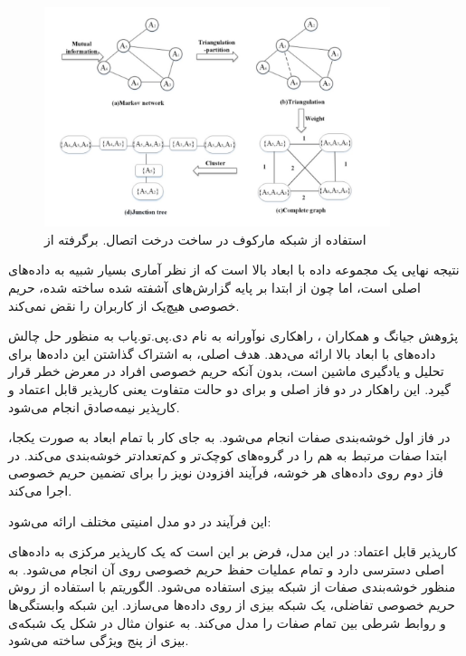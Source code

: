 \begin{figure}[h]
  \centering
  \includegraphics[width=0.9\textwidth]{figs/PrivPJ_Markov.jpg}
  \caption{استفاده از شبکه مارکوف در ساخت درخت اتصال. برگرفته از }
  \label{fig:PrivPJ}
\end{figure}

نتیجه نهایی یک مجموعه داده با ابعاد بالا است که از نظر آماری بسیار شبیه به داده‌های اصلی است، اما چون از ابتدا بر پایه گزارش‌های آشفته ‌شده ساخته شده، حریم خصوصی هیچ‌یک از کاربران را نقض نمی‌کند.


پژوهش جیانگ و همکاران ، راهکاری نوآورانه به نام دی.پی.تو.پاب به منظور حل چالش داده‌های با ابعاد بالا ارائه می‌دهد. هدف اصلی، به اشتراک گذاشتن این داده‌ها برای تحلیل و یادگیری ماشین است، بدون آنکه حریم خصوصی افراد در معرض خطر قرار گیرد. این راهکار در دو فاز اصلی و برای دو حالت متفاوت یعنی کارپذیر قابل اعتماد و کارپذیر نیمه‌صادق انجام می‌شود. 

در فاز اول خوشه‌بندی صفات انجام می‌شود. به جای کار با تمام ابعاد به صورت یکجا، ابتدا صفات مرتبط به هم را در گروه‌های کوچک‌تر و کم‌تعدادتر خوشه‌بندی می‌کند. در فاز دوم روی داده‌های هر خوشه، فرآیند افزودن نویز را برای تضمین حریم خصوصی اجرا می‌کند. 

این فرآیند در دو مدل امنیتی مختلف ارائه می‌شود:


 کارپذیر قابل اعتماد: در این مدل، فرض بر این است که یک کارپذیر مرکزی به داده‌های اصلی دسترسی دارد و تمام عملیات حفظ حریم خصوصی روی آن انجام می‌شود. به منظور خوشه‌بندی صفات از شبکه بیزی استفاده می‌شود. الگوریتم با استفاده از روش حریم خصوصی تفاضلی، یک شبکه بیزی از روی داده‌ها می‌سازد. این شبکه وابستگی‌ها و روابط شرطی بین تمام صفات را مدل می‌کند. به عنوان مثال در شکل  یک شبکه‌ی بیزی از پنج ویژگی ساخته می‌شود.

